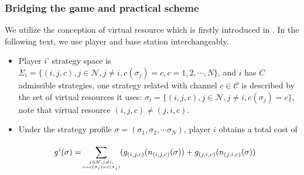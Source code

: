 \subsubsection{Bridging the game and practical scheme}
\label{gameforproblem}
We utilize the conception of virtual resource which is firstly introduced in \cite{allerton08_liu}. In the following text, we use player and base station interchangeably.

\begin{itemize}
\item Player $i$' strategy space is $\Sigma_i=\{(i,j,c), j\in \mathcal{N}, j\ne i, c(\sigma_j)=c, c=1,2,\cdots,N\}$, and $i$ has $C$ admissible strategies, one strategy related with channel $c\in\mathcal{C}$ is described by the set of virtual resources it uses: $\sigma_i=\{(i,j,c), j\in \mathcal{N}, j\ne i, c(\sigma_j)=c\}$, note that virtual resource $(i,j,c)\neq(j,i,c)$.

\item Under the strategy profile $\sigma=(\sigma_1, \sigma_2, \cdots \sigma_N)$, player $i$ obtains a total cost of 

	\begin{equation}
\label{6}
		\begin{split}
		g^i(\sigma)=
		& \sum\limits^{}_{\tiny\substack{j\in \mathcal{N},j\neq i,\\ c=c(\sigma_i)=c(\sigma_j)}} (g_{(i,j,c)}(n_{(i,j,c)}(\sigma))+g_{(j,i,c)}(n_{(j,i,c)}(\sigma))
		\end{split}
		\end{equation}
\end{itemize}

